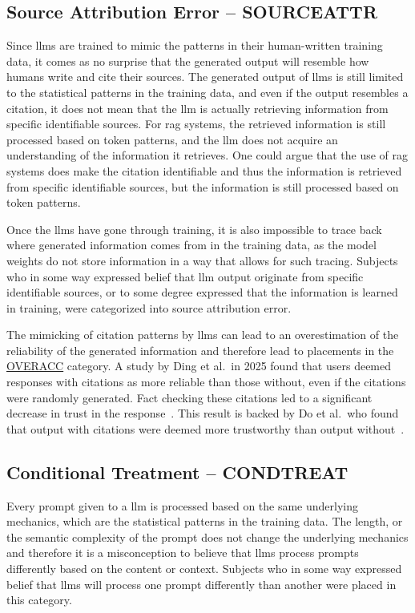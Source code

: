 \subsection{Source Attribution Error -- SOURCEATTR}\label{sourceattr}
Since \gls{llms} are trained to mimic the patterns in their human-written training data, it comes as no surprise that the generated output will resemble how humans write and cite their sources. The generated output of \gls{llms} is still limited to the statistical patterns in the training data, and even if the output resembles a citation, it does not mean that the \gls{llm} is actually retrieving information from specific identifiable sources. For \gls{rag} systems, the retrieved information is still processed based on token patterns, and the \gls{llm} does not acquire an understanding of the information it retrieves. One could argue that the use of \gls{rag} systems does make the citation identifiable and thus the information is retrieved from specific identifiable sources, but the information is still processed based on token patterns. 

Once the \gls{llms} have gone through training, it is also impossible to trace back where generated information comes from in the training data, as the model weights do not store information in a way that allows for such tracing. Subjects who in some way expressed belief that \gls{llm} output originate from specific identifiable sources, or to some degree expressed that the information is learned in training, were categorized into source attribution error.

The mimicking of citation patterns by \gls{llms} can lead to an overestimation of the reliability of the generated information and therefore lead to placements in the \hyperref[overacc]{OVERACC} category. A study by Ding et al.\ in 2025 found that users deemed responses with citations as more reliable than those without, even if the citations were randomly generated. Fact checking these citations led to a significant decrease in trust in the response~\cite{ding_citations_2025}. This result is backed by Do et al.\ who found that output with citations were deemed more trustworthy than output without~\cite{do_facilitating_2024}.

\subsection{Conditional Treatment -- CONDTREAT}\label{condtreat}
Every prompt given to a \gls{llm} is processed based on the same underlying mechanics, which are the statistical patterns in the training data. The length, or the semantic complexity of the prompt does not change the underlying mechanics and therefore it is a misconception to believe that \gls{llms} process prompts differently based on the content or context. Subjects who in some way expressed belief that \gls{llms} will process one prompt differently than another were placed in this category.

